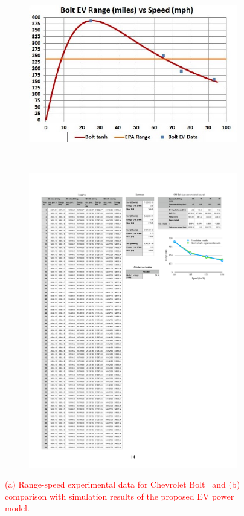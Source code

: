\documentclass{IEEEtran}
\begin{document}
\begin{figure}   %
\centering
	\begin{subfigure}{0.4\textwidth}
	\includegraphics[width=\hsize]{Figures/Bolt_EV_range.jpg}
	\caption{}
	\label{fig:range_speed_exp}
	\end{subfigure}
~
	\begin{subfigure}{0.4\textwidth}
	\includegraphics[width=\hsize]{Figures/Range-speed_validation.pdf}
	\caption{}
	\label{fig:range_speed_valid}
	\end{subfigure}
\caption{\textcolor{red}{(a) Range-speed experimental data for Chevrolet Bolt~\cite{GM_Bolt:range_speed} and (b) comparison with simulation results of the proposed EV power model.}}
\end{figure}
\end{document}
